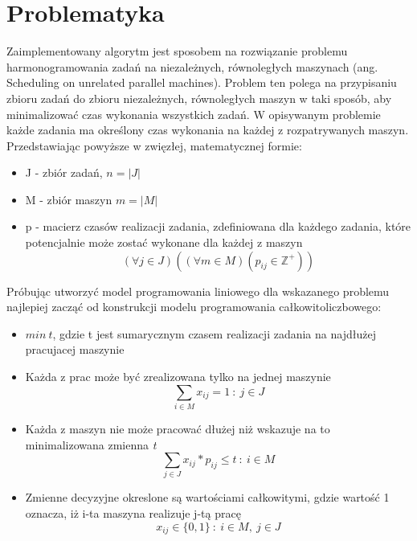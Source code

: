 \documentclass[12pt, a4paper]{report}
\begin{document}
\chapter{Problematyka}
  Zaimplementowany algorytm jest sposobem na rozwiązanie problemu harmonogramowania zadań na niezależnych, równoległych
  maszynach (ang. Scheduling on unrelated parallel machines). Problem ten polega na przypisaniu 
  zbioru zadań do zbioru niezależnych, równoległych maszyn w taki sposób, aby minimalizować czas wykonania wszystkich zadań.
  W opisywanym problemie każde zadania ma określony czas wykonania na każdej z rozpatrywanych maszyn.
  Przedstawiając powyższe w zwięzłej, matematycznej formie:
  \begin{itemize}
    \item J - zbiór zadań, $n = |J|$
    \item M - zbiór maszyn $m = |M|$
    \item p - macierz czasów realizacji zadania, zdefiniowana dla każdego zadania, które potencjalnie może zostać 
    wykonane dla każdej z maszyn 
    \begin{equation}
      (\forall j \in J) ((\forall m \in M) (p_{ij} \in \mathbb{Z}^{+} ))
    \end{equation}

  \end{itemize}
  Próbując utworzyć model programowania liniowego dla wskazanego problemu najlepiej zacząć 
  od konstrukcji modelu programowania całkowitoliczbowego:
  \begin{itemize}
    \item $min \: t$, gdzie t jest sumarycznym czasem realizacji zadania na najdłużej pracujacej maszynie
    \item Każda z prac może być zrealizowana tylko na jednej maszynie
    \begin{equation}
      \sum_{i \in M} x_{ij} = 1 \: : \: j \in J
    \end{equation} 
    \item Każda z maszyn nie może pracować dłużej niż wskazuje na to minimalizowana zmienna \textit{t}
    \begin{equation}
      \sum_{j \in J} x_{ij} * p_{ij} \leq t \: : \: i \in M
    \end{equation}
    \item Zmienne decyzyjne okreslone są wartościami całkowitymi, gdzie wartość 1 oznacza, 
    iż i-ta maszyna realizuje j-tą pracę
    \begin{equation}
      x_{ij} \in \{0,1\} \: : \: i \in M, \: j \in J
    \end{equation}
  \end{itemize}
\end{document}
